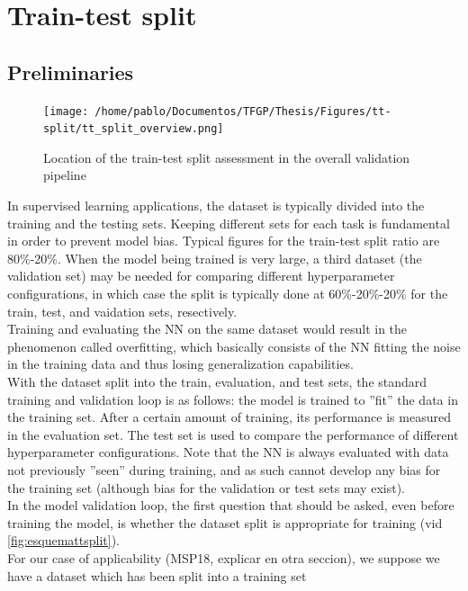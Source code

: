 \section{Train-test split}
\subsection{Preliminaries}
\begin{figure}[!b]
	\centering
	\texttt{[image: /home/pablo/Documentos/TFGP/Thesis/Figures/tt-split/tt\_split\_overview.png]}
	\caption{Location of the train-test split assessment in the overall validation pipeline}
	\label{fig:esquemattsplit}
\end{figure}
\indent In supervised learning applications, the dataset is typically divided into the training and the testing sets. Keeping different sets for each task is fundamental in order to prevent model bias. Typical figures for the train-test split ratio are 80\%-20\%. When the model being trained is very large, a third dataset (the validation set) may be needed for comparing different hyperparameter configurations, in which case the split is typically done at 60\%-20\%-20\% for the train, test, and vaidation sets, resectively\cite[pp. 20-21]{Marsland2015Machine}.\\
%
\indent Training and evaluating the NN on the same dataset would result in the phenomenon called overfitting\cite[pp. 19-20]{Marsland2015Machine}, which basically consists of the NN fitting the noise in the training data and thus losing generalization capabilities.\\
%
\indent With the dataset split into the train, evaluation, and test sets, the standard training and validation loop is as follows: the model is trained to ''fit'' the data in the training set. After a certain amount of training, its performance is measured in the evaluation set. The test set is used to compare the performance of different hyperparameter configurations. Note that the NN is always evaluated with data not previously ''seen'' during training, and as such cannot develop any bias for the training set (although bias for the validation or test sets may exist).\\
%
\indent In the model validation loop, the first question that should be asked, even before training the model, is whether the dataset split is appropriate for training (vid \autoref{fig:esquemattsplit}).\\
%
\indent For our case of applicability (MSP18, explicar en otra seccion), we suppose we have a dataset which has been split into a training set
